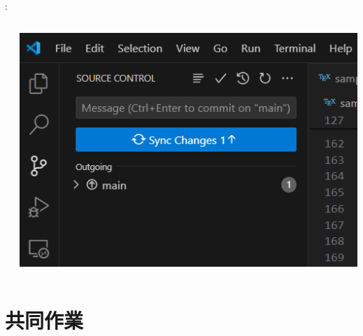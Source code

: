 \documentclass[aspectratio=169,dvipdfmx,cjk]{beamer}
\begin{document}
\begin{frame}[label=git]{\insertsection \thesubsection: \insertsubsection}
\begin{columns}
\begin{column}{0.3\textwidth}
    \end{column}
    \begin{column}{0.3\textwidth}
      \includegraphics[width=1.0\linewidth]{fig/git-sync.png}
    \end{column}
  \end{columns}
\end{frame}

\section{共同作業}
\end{document}
